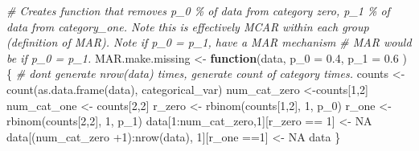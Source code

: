 \documentclass[
]{article}
\newenvironment{Shaded}{\begin{snugshade}}{\end{snugshade}}
\newcommand{\AttributeTok}[1]{\textcolor[rgb]{0.77,0.63,0.00}{#1}}
\newcommand{\CommentTok}[1]{\textcolor[rgb]{0.56,0.35,0.01}{\textit{#1}}}
\newcommand{\ConstantTok}[1]{\textcolor[rgb]{0.00,0.00,0.00}{#1}}
\newcommand{\ControlFlowTok}[1]{\textcolor[rgb]{0.13,0.29,0.53}{\textbf{#1}}}
\newcommand{\DecValTok}[1]{\textcolor[rgb]{0.00,0.00,0.81}{#1}}
\newcommand{\FloatTok}[1]{\textcolor[rgb]{0.00,0.00,0.81}{#1}}
\newcommand{\FunctionTok}[1]{\textcolor[rgb]{0.00,0.00,0.00}{#1}}
\newcommand{\NormalTok}[1]{#1}
\newcommand{\OtherTok}[1]{\textcolor[rgb]{0.56,0.35,0.01}{#1}}
\newcommand{\SpecialCharTok}[1]{\textcolor[rgb]{0.00,0.00,0.00}{#1}}
\begin{document}
\begin{Shaded}
\begin{Highlighting}[]
\CommentTok{\# Creates function that removes p\_0 \% of data from category zero, p\_1 \% of data from category\_one. Note this is effectively MCAR within each group (definition of MAR). Note if p\_0 = p\_1, have a MAR mechanism}
\CommentTok{\# MAR would be if p\_0 = p\_1.}
\NormalTok{MAR.make.missing }\OtherTok{\textless{}{-}} \ControlFlowTok{function}\NormalTok{(data, }\AttributeTok{p\_0 =} \FloatTok{0.4}\NormalTok{, }\AttributeTok{p\_1 =} \FloatTok{0.6}\NormalTok{ )\{}
  \CommentTok{\# don\textquotesingle{}t generate nrow(data) times, generate count of category times.}
\NormalTok{  counts }\OtherTok{\textless{}{-}} \FunctionTok{count}\NormalTok{(}\FunctionTok{as.data.frame}\NormalTok{(data), categorical\_var)}
\NormalTok{  num\_cat\_zero }\OtherTok{\textless{}{-}}\NormalTok{counts[}\DecValTok{1}\NormalTok{,}\DecValTok{2}\NormalTok{]}
\NormalTok{  num\_cat\_one }\OtherTok{\textless{}{-}}\NormalTok{ counts[}\DecValTok{2}\NormalTok{,}\DecValTok{2}\NormalTok{]}
\NormalTok{  r\_zero }\OtherTok{\textless{}{-}} \FunctionTok{rbinom}\NormalTok{(counts[}\DecValTok{1}\NormalTok{,}\DecValTok{2}\NormalTok{], }\DecValTok{1}\NormalTok{, p\_0)}
\NormalTok{  r\_one }\OtherTok{\textless{}{-}} \FunctionTok{rbinom}\NormalTok{(counts[}\DecValTok{2}\NormalTok{,}\DecValTok{2}\NormalTok{], }\DecValTok{1}\NormalTok{, p\_1)}
\NormalTok{  data[}\DecValTok{1}\SpecialCharTok{:}\NormalTok{num\_cat\_zero,}\DecValTok{1}\NormalTok{][r\_zero }\SpecialCharTok{==} \DecValTok{1}\NormalTok{] }\OtherTok{\textless{}{-}} \ConstantTok{NA}
\NormalTok{  data[(num\_cat\_zero }\SpecialCharTok{+}\DecValTok{1}\NormalTok{)}\SpecialCharTok{:}\FunctionTok{nrow}\NormalTok{(data), }\DecValTok{1}\NormalTok{][r\_one }\SpecialCharTok{==}\DecValTok{1}\NormalTok{] }\OtherTok{\textless{}{-}} \ConstantTok{NA}
\NormalTok{  data}
\NormalTok{\}}
\end{Highlighting}
\end{Shaded}
\end{document}

